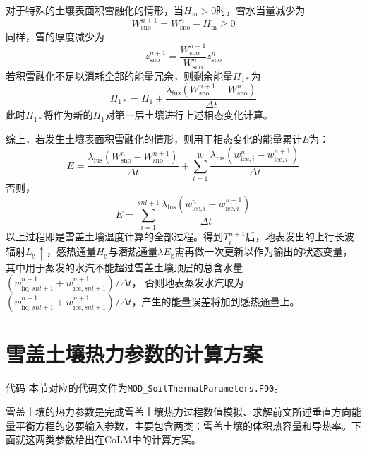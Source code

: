 对于特殊的土壤表面积雪融化的情形，当$H_{\mathrm {m}} >0$时，雪水当量减少为
\begin{equation}
  W_{\mathrm{sno}}^{n+1}=W_{\mathrm{s no}}^{n}-H_{\mathrm{m}} \geqslant 0
\end{equation}
同样，雪的厚度减少为
\begin{equation}
  z_{\mathrm{sno}}^{n+1}=\frac{W_{\mathrm{sno}}^{n+1}}{W_{\mathrm{sno}}^{n}} z_{\mathrm{sno}}^{n}
\end{equation}
若积雪融化不足以消耗全部的能量冗余，则剩余能量$H_{1\ast}$为
\begin{equation}
  H_{1 *}=H_{1}+\frac{\lambda_{\mathrm {fus}}\left(W_{\mathrm{sno}}^{n+1}-W_{\mathrm{sno}}^{n}\right)}{\Delta t}
\end{equation}
此时$H_{1\ast}$将作为新的$H_1$对第一层土壤进行上述相态变化计算。


综上，若发生土壤表面积雪融化的情形，则用于相态变化的能量累计$E$为：
\begin{equation}
  E=\frac{\lambda_{\mathrm {fus}}\left(W_{\mathrm{sno}}^{n}-W_{\mathrm{sno}}^{n+1}\right)}{\Delta t}+\sum_{i=1}^{10} \frac{\lambda_{\mathrm {fus}}\left(w_{\mathrm{ice},i}^{n}-w_{\mathrm{ice},i}^{n+1}\right)}{\Delta t}
\end{equation}
否则，
\begin{equation}
  E=\sum_{i=1}^{s n l+1} \frac{\lambda_{\mathrm {fus}}\left(w_{\mathrm{ice},i}^{n}-w_{\mathrm{ice},i}^{n+1}\right)}{\Delta t}
\end{equation}
以上过程即是雪盖土壤温度计算的全部过程。得到$T_i^{n+1}$后，地表发出的上行长波辐射$L_{\mathrm {g}} \uparrow$，感热通量$H_{\mathrm {g}} $与潜热通量$\lambda E_{\mathrm {g}} $需再做一次更新以作为输出的状态变量，
其中用于蒸发的水汽不能超过雪盖土壤顶层的总含水量$\left(w_{\mathrm{liq},snl+1}^{n+1}+w_{\mathrm{ice},snl+1}^{n+1}\right)/\Delta t$，
否则地表蒸发水汽取为$\left(w_{\mathrm{liq},snl+1}^{n+1}+w_{\mathrm{ice},snl+1}^{n+1}\right)/\Delta t$，产生的能量误差将加到感热通量上。


\section{雪盖土壤热力参数的计算方案}\label{sec_thermalpar}
\begin{mymdframed}{代码}
  本节对应的代码文件为\texttt{MOD\_SoilThermalParameters.F90}。
\end{mymdframed}

雪盖土壤的热力参数是完成雪盖土壤热力过程数值模拟、求解前文所述垂直方向能量平衡方程的必要输入参数，主要包含两类：雪盖土壤的体积热容量和导热率。下面就这两类参数给出在CoLM中的计算方案。

